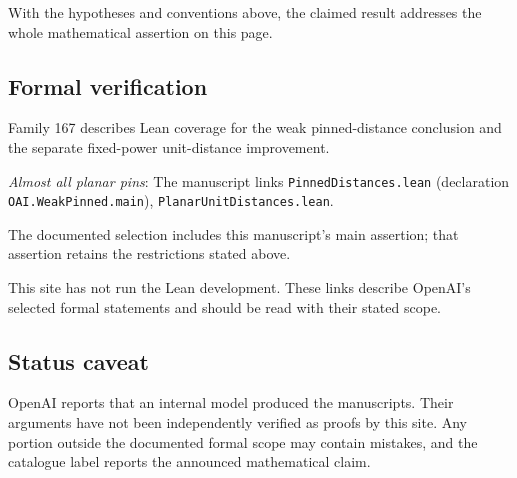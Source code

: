 \documentclass[11pt]{article}
\begin{document}
With the hypotheses and conventions above, the claimed result addresses the whole mathematical assertion on this page.

\subsection{Formal verification}
Family 167 describes Lean coverage for the weak pinned-distance conclusion and the separate fixed-power unit-distance improvement.

\textit{Almost all planar pins}: The manuscript links \texttt{PinnedDistances.lean} (declaration \texttt{OAI.WeakPinned.main}), \texttt{PlanarUnitDistances.lean}.

The documented selection includes this manuscript’s main assertion; that assertion retains the restrictions stated above.

This site has not run the Lean development. These links describe OpenAI’s selected formal statements and should be read with their stated scope.

\subsection{Status caveat}
OpenAI reports that an internal model produced the manuscripts. Their arguments have not been independently verified as proofs by this site. Any portion outside the documented formal scope may contain mistakes, and the catalogue label reports the announced mathematical claim.
\end{document}
